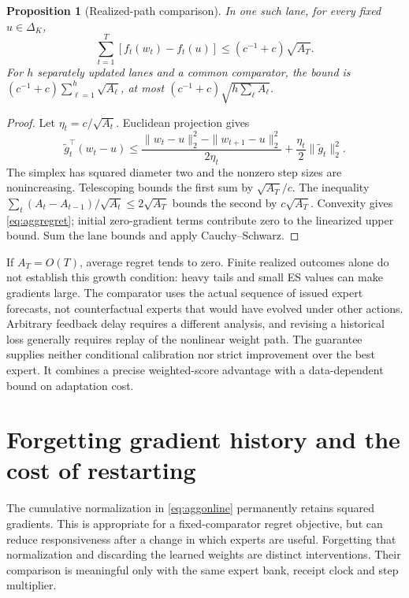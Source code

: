 \documentclass[11pt,a4paper]{article}
\newtheorem{proposition}[theorem]{Proposition}
\theoremstyle{definition}\newtheorem{definition}[theorem]{Definition}
\begin{document}
\begin{proposition}[Realized-path comparison]\label{prop:aggregret}
In one such lane, for every fixed $u\in\Delta_K$,
\begin{equation}
 \sum_{t=1}^{T}[f_t(w_t)-f_t(u)]
 \le(c^{-1}+c)\sqrt{A_T}.
 \label{eq:aggregret}
\end{equation}
For $h$ separately updated lanes and a common comparator, the bound is
$(c^{-1}+c)\sum_{\ell=1}^h\sqrt{A_\ell}$, at most
$(c^{-1}+c)\sqrt{h\sum_\ell A_\ell}$.
\end{proposition}
\begin{proof}
Let $\eta_t=c/\sqrt{A_t}$. Euclidean projection gives
\[
 \widetilde g_t^\top(w_t-u)\le
 \frac{\|w_t-u\|_2^2-\|w_{t+1}-u\|_2^2}{2\eta_t}
       +\frac{\eta_t}{2}\|\widetilde g_t\|_2^2.
\]
The simplex has squared diameter two and the nonzero step sizes are nonincreasing. Telescoping bounds the first sum by $\sqrt{A_T}/c$. The inequality $\sum_t (A_t-A_{t-1})/\sqrt{A_t}\le2\sqrt{A_T}$ bounds the second by $c\sqrt{A_T}$. Convexity gives \eqref{eq:aggregret}; initial zero-gradient terms contribute zero to the linearized upper bound. Sum the lane bounds and apply Cauchy--Schwarz.
\end{proof}
If $A_T=O(T)$, average regret tends to zero. Finite realized outcomes alone do not establish this growth condition: heavy tails and small ES values can make gradients large. The comparator uses the actual sequence of issued expert forecasts, not counterfactual experts that would have evolved under other actions. Arbitrary feedback delay requires a different analysis, and revising a historical loss generally requires replay of the nonlinear weight path. The guarantee supplies neither conditional calibration nor strict improvement over the best expert. It combines a precise weighted-score advantage with a data-dependent bound on adaptation cost.

\section{Forgetting gradient history and the cost of restarting}\label{sec:forgetting}
The cumulative normalization in \eqref{eq:aggonline} permanently retains squared gradients. This is appropriate for a fixed-comparator regret objective, but can reduce responsiveness after a change in which experts are useful. Forgetting that normalization and discarding the learned weights are distinct interventions. Their comparison is meaningful only with the same expert bank, receipt clock and step multiplier.
\end{document}
